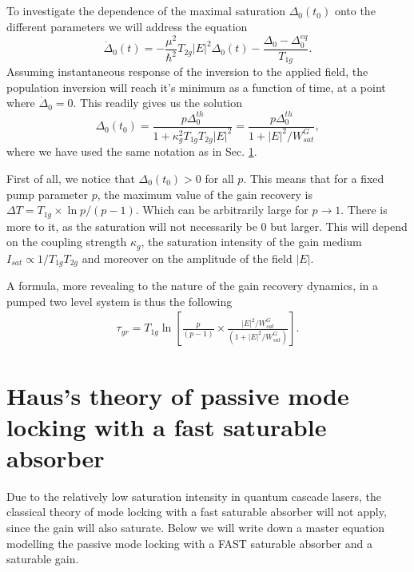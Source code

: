 \documentclass[preprint,secnumarabic,amssymb, nobibnotes, aip, prd]{revtex4-1}
\begin{document}
\subsection{}
To investigate the dependence of the maximal saturation $\Delta_0(t_0)$ onto the different parameters we will address the equation
\begin{equation}
\label{eq:inversion3}
\dot\Delta_0(t) = -\frac{\mu^2}{\hbar^2}T_{2g} |E|^2\Delta_0(t) -\frac{\Delta_0-\Delta_0^{eq}}{T_{1g}}.
\end{equation}
Assuming instantaneous response of the inversion to the applied field, the population inversion will reach it's minimum as a function of time, at a point where $\dot\Delta_0 = 0$. This readily gives us the solution
\begin{equation}
\label{eq:saturation}
\Delta_0(t_0) =  \frac{ p\Delta_0^{th}}{1+\kappa_g^2T_{1g}T_{2g}|E|^2} = \frac{ p\Delta_0^{th}}{1+|E|^2/W_{sat}^G} ,
\end{equation} 
where we have used the same notation as in Sec. \ref{sec:haustheory}.


First of all, we notice that $\Delta_0(t_0) >0$ for all $p$. This means that for a fixed pump parameter $p$, the maximum value of the gain recovery is $\Delta T= T_{1g}\times\ln p/(p-1)$. Which can be arbitrarily large for $p\to 1$. There is more to it, as the saturation will not necessarily be 0 but larger. This will depend on the coupling strength $\kappa_g$, the saturation intensity of the gain medium $I_{sat}\propto 1/T_{1g}T_{2g}$ and moreover on the amplitude of the field $|E|$.

A formula, more revealing to the nature of the gain recovery dynamics, in a pumped two level system is thus the following
\begin{align}
\label{eq:gainrecovery2}
\tau_{gr} = T_{1g} \ln\left[\frac{p}{\left(p-1\right)}\times\frac{|E|^2/W_{sat}^G}{\left (1+|E|^2/W_{sat}^G\right)}\right].
\end{align}


\section{Haus's theory of passive mode locking with a fast saturable absorber}
\label{sec:haustheory}

Due to the relatively low saturation intensity in quantum cascade lasers, the classical theory of mode locking with a fast saturable absorber will not apply, since the gain will also saturate. Below we will write down a master equation modelling the passive mode locking  with a FAST saturable absorber and a saturable gain. 
\end{document}
